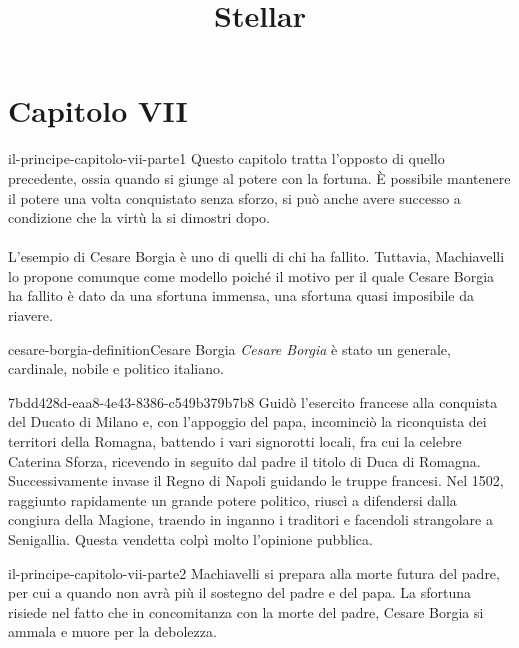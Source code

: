 \documentclass[preview]{standalone}
\begin{document}
\title{Stellar}
\genpage

\section{Capitolo VII}

\begin{snippet}{il-principe-capitolo-vii-parte1}
    Questo capitolo tratta l'opposto di quello precedente, ossia quando si giunge al potere
    con la fortuna.
    È possibile mantenere il potere una volta conquistato senza sforzo, si può
    anche avere successo a condizione che la virtù la si dimostri dopo.
    \\\\
    L'esempio di Cesare Borgia è uno di quelli di chi ha fallito.
    Tuttavia, Machiavelli lo propone comunque come modello poiché
    il motivo per il quale Cesare Borgia ha fallito è dato da una sfortuna immensa,
    una sfortuna quasi imposibile da riavere.
\end{snippet}

\begin{snippetdefinition}{cesare-borgia-definition}{Cesare Borgia}
    \textit{Cesare Borgia} è stato un generale, cardinale, nobile e politico italiano.
\end{snippetdefinition}

\begin{snippetnote}{7bdd428d-eaa8-4e43-8386-c549b379b7b8}{}%
    Guidò l'esercito francese alla conquista del Ducato di Milano e,
    con l'appoggio del papa, incominciò la riconquista dei territori della Romagna,
    battendo i vari signorotti locali, fra cui la celebre Caterina Sforza,
    ricevendo in seguito dal padre il titolo di Duca di Romagna.
    Successivamente invase il Regno di Napoli guidando le truppe francesi.
    Nel 1502, raggiunto rapidamente un grande potere politico,
    riuscì a difendersi dalla congiura della Magione,
    traendo in inganno i traditori e facendoli strangolare a Senigallia.
    Questa vendetta colpì molto l'opinione pubblica.
\end{snippetnote}

\begin{snippet}{il-principe-capitolo-vii-parte2}
    Machiavelli si prepara alla morte futura del padre, per cui a quando
    non avrà più il sostegno del padre e del papa.
    La sfortuna risiede nel fatto che in concomitanza con la morte del padre,
    Cesare Borgia si ammala e muore per la debolezza.
\end{snippet}
\end{document}
